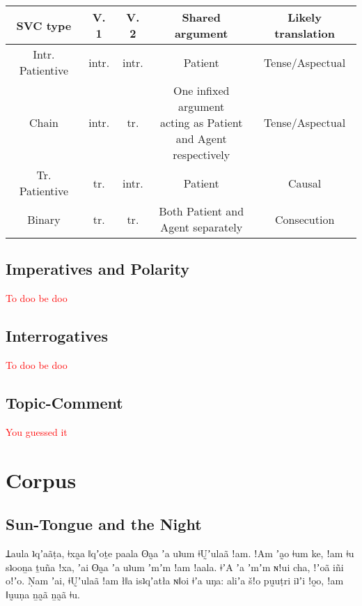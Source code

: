 \documentclass[11pt,a5paper]{book}
\newcommand{\prose}[1]{\begin{center}\begin{minipage}{0.8\textwidth}\large #1\end{minipage}\end{center}}
\newcommand{\cmnt}[1]{\textcolor{red}{#1}}
\begin{document}
\begin{center}
\renewcommand{\arraystretch}{2}
\setlength\tabcolsep{1.3pt}
\begin{tabular}{ccccc}
\hline
\textbf{SVC type} & \textbf{V. 1} & \textbf{V. 2} & \textbf{Shared argument} & \textbf{Likely translation}\\\hline \hline
Intr. Patientive & intr. & intr. & Patient & Tense/Aspectual \\ \hline
Chain & intr. & tr. &\makecell{One infixed argument\\ acting as Patient\\and Agent respectively} & Tense/Aspectual \\\hline
Tr. Patientive & tr. & intr. & Patient & Causal \\\hline
Binary & tr. & tr. & \makecell{Both Patient and\\Agent separately} & Consecution \\  \hline
\end{tabular}
\end{center}

\section{Imperatives and Polarity}

\cmnt{To doo be doo}

\section{Interrogatives}

\cmnt{To doo be doo}

\section{Topic-Comment}\label{sec:topiccomment}

\cmnt{You guessed it}

\chapter{Corpus}

\section{Sun-Tongue and the Night}

\prose{ Ʇaula ʇqʼaãṭa, ǂxa̰a ǁqʼoṯe paala ʘa̰a ʼa uʇum ǂṴʼulaã ǃam.
ǃAm ʼa̰o ǂum ke, ǃam ǂu sʇooṉa ṯuña ǃxa, ʼai ʘa̰a ʼa uʇum ʼmʼm ǃam ǃaala.
ǂʼA ʼa ʼmʼm ɴǃui cha, ǃʼoã iñi oǃʼo.
Ṇam ʼai, ǂṴʼulaã ǃam łǁa isʇqʼatła ɴǁoi ǂʼa uŋa:
aliʼa šǃo pṵuṭri iʇʼi ǃo̰o, ǃam ǁṵuṇa ṉa̰ã ṉa̰ã ǂu. }
\end{document}
